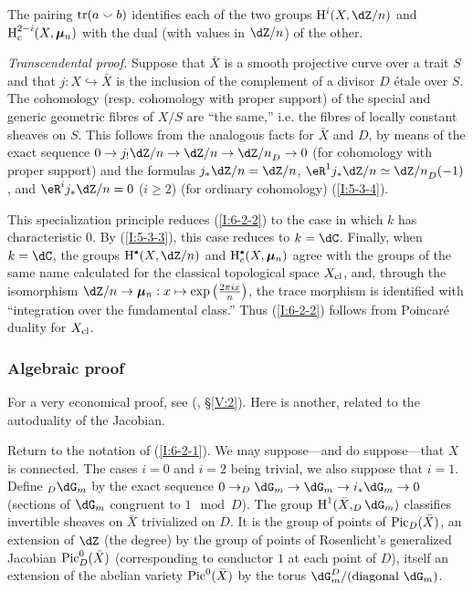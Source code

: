 \begin{theorem}\label{I:6-2-2}
The pairing $\operatorname{tr}(a\smallsmile b)$ identifies each of the two groups
$\h^i(X,\dZ/n)$ and $\operatorname{H}_c^{2-i}(X,{\bm\mu}_n)$ with the dual (with values
in $\dZ/n$) of the other.
\end{theorem}

\emph{Transcendental proof.} Suppose that $\bar X$ is a smooth projective
curve over a trait $S$ and that $j:X\hookrightarrow\bar X$ is the
inclusion of the complement of a divisor $D$ étale over $S$. The
cohomology (resp. cohomology with proper support) of the special and
generic geometric fibres of $X/S$ are “the same,” i.e. the fibres of
locally constant sheaves on $S$. This follows from the analogous facts
for $\bar X$ and $D$, by means of the exact sequence
$0\to j_!\dZ/n\to\dZ/n\to{\dZ/n}_D\to0$ (for cohomology with proper
support) and the formulas $j_*\dZ/n=\dZ/n$,
$\eR^1j_*\dZ/n\simeq{\dZ/n}_D(-1)$, and
$\eR^ij_*\dZ/n=0$ ($i\geqslant2$) (for ordinary cohomology)
(\ref{I:5-3-4}).

This specialization principle reduces (\ref{I:6-2-2}) to the case in
which $k$ has characteristic $0$. By (\ref{I:5-3-3}), this case reduces
to $k=\dC$. Finally, when $k=\dC$, the groups
$\h^\bullet(X,\dZ/n)$ and $\h_c^\bullet(X,\dmu_n)$ agree with the
groups of the same name calculated for the classical topological space
$X_{\textnormal{cl}}$, and, through the isomorphism
$\dZ/n\to\dmu_n:x\mapsto\exp\left(\frac{2\pi ix}{n}\right)$, the trace
morphism is identified with “integration over the fundamental class.”
Thus (\ref{I:6-2-2}) follows from Poincaré duality for
$X_{\textnormal{cl}}$.

\subsubsection{Algebraic proof}\label{I:6-2-3}

For a very economical proof, see (, \S\ref{V:2}).
Here is another, related to the autoduality of the Jacobian.

Return to the notation of (\ref{I:6-2-1}). We may suppose---and do
suppose---that $X$ is connected. The cases $i=0$ and $i=2$ being
trivial, we also suppose that $i=1$. Define $_D\dG_m$ by the exact
sequence $0\to_D\dG_m\to\dG_m\to i_*\dG_m\to0$ (sections of $\dG_m$
congruent to $1\mod D$). The group $\h^1(\bar X,_D\dG_m)$ classifies
invertible sheaves on $\bar X$ trivialized on $D$. It is the group of
points of $\operatorname{Pic}_D(\bar X)$, an extension of $\dZ$ (the degree) by the
group of points of Rosenlicht's generalized Jacobian
$\operatorname{Pic}_D^0(\bar X)$ (corresponding to conductor $1$ at each point of
$D$), itself an extension of the abelian variety $\operatorname{Pic}^0(\bar X)$ by
the torus $\dG_m^D/(\text{diagonal $\dG_m$})$.


